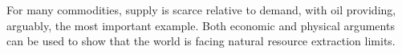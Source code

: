 

For many commodities, supply is scarce relative to demand, 
with oil providing, arguably, the most important example. 
Both economic and physical arguments can be used to show that the world is facing
natural resource extraction limits.

